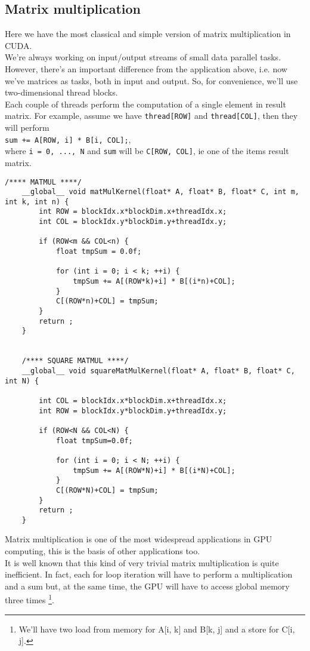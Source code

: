 \subsection{Matrix multiplication}
	Here we have the most classical and simple version of matrix multiplication in CUDA.\\
	We're always working on input/output streams of small data parallel tasks.
    However, there's an important difference from the application above, i.e. now we've matrices as tasks, both in input and output. So, for convenience, we'll use two-dimensional thread blocks.\\  
	Each couple of threads perform the computation of a single element in result matrix. For example, assume we have \texttt{thread[ROW]} and \texttt{thread[COL]}, then they will perform\\ \texttt{sum += A[ROW, i] * B[i, COL];},\\ where \texttt{i = 0, ..., N} and \texttt{sum} will be \texttt{C[ROW, COL]}, ie one of the items result matrix.
	\begin{lstlisting}[caption={Implementation for Matrix Multiplication Kernel, both non-square and square}]
	/**** MATMUL ****/
	__global__ void matMulKernel(float* A, float* B, float* C, int m, int k, int n) {   
		int ROW = blockIdx.x*blockDim.x+threadIdx.x;
		int COL = blockIdx.y*blockDim.y+threadIdx.y;
		
		if (ROW<m && COL<n) {
			float tmpSum = 0.0f;			
	
			for (int i = 0; i < k; ++i) {
				tmpSum += A[(ROW*k)+i] * B[(i*n)+COL];
			}        
			C[(ROW*n)+COL] = tmpSum;
		}
		return ;
	}
	
		
	/**** SQUARE MATMUL ****/
	__global__ void squareMatMulKernel(float* A, float* B, float* C, int N) {

		int COL = blockIdx.x*blockDim.x+threadIdx.x;
		int ROW = blockIdx.y*blockDim.y+threadIdx.y;
		
		if (ROW<N && COL<N) {
			float tmpSum=0.0f;        
		
			for (int i = 0; i < N; ++i) {
				tmpSum += A[(ROW*N)+i] * B[(i*N)+COL];
			}        
			C[(ROW*N)+COL] = tmpSum;        
		}
		return ;
	}
	\end{lstlisting}
	Matrix multiplication is one of the most widespread applications in GPU computing, this is the basis of other applications too.\\
	It is well known that this kind of very trivial matrix multiplication is quite inefficient. In fact, each for loop iteration will have to perform a multiplication and a sum but, at the same time, the GPU will have to access global memory three times \footnote{We'll have two load from memory for A[i, k] and B[k, j] and a store for C[i, j].}.\\
